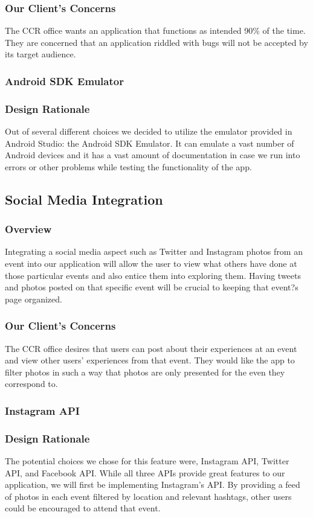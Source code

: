 \documentclass[draftclsnofoot, onecolumn, 10pt, compsoc]{IEEEtran}
\begin{document}
			\subsubsection{Our Client's Concerns}
				The CCR office wants an application that functions as intended 90\% of the time. They are concerned that an application riddled with bugs will not be accepted by its target audience.
			\subsubsection{Android SDK Emulator}
			\subsubsection{Design Rationale}
				Out of several different choices we decided to utilize the emulator provided in Android Studio: the Android SDK Emulator. It can emulate a vast number of Android devices and it has a vast amount of documentation in case we run into errors or other problems while testing the functionality of the app.

		\subsection{Social Media Integration}
			\subsubsection{Overview}
				Integrating a social media aspect such as Twitter and Instagram photos from an event into our application will allow the user to view what others have done at those particular events and also entice them into exploring them. Having tweets and photos posted on that specific event will be crucial to keeping that event?s page organized. 
			\subsubsection{Our Client's Concerns}
				The CCR office desires that users can post about their experiences at an event and view other users' experiences from that event. They would like the app to filter photos in such a way that photos are only presented for the even they correspond to.
			\subsubsection{Instagram API}
			\subsubsection{Design Rationale}
				The potential choices we chose for this feature were, Instagram API, Twitter API, and Facebook API. While all three APIs provide great features to our application, we will first be implementing Instagram's API. By providing a feed of photos in each event filtered by location and relevant hashtags, other users could be encouraged to attend that event.
\end{document}
